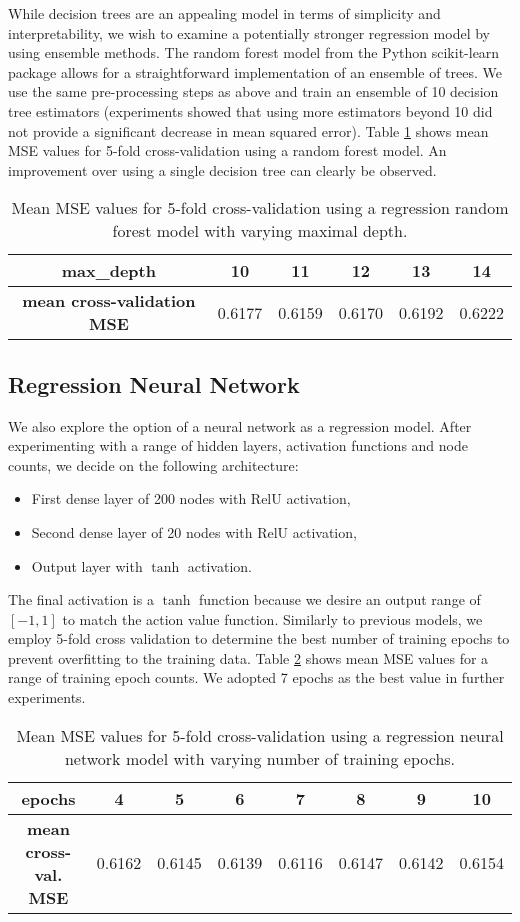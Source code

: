 \documentclass{sfuthesis}
\begin{document}
	While decision trees are an appealing model in terms of simplicity and interpretability, we wish to examine a potentially stronger regression model by using ensemble methods. The random forest model from the Python scikit-learn package allows for a straightforward implementation of an ensemble of trees. We use the same pre-processing steps as above and train an ensemble of 10 decision tree estimators (experiments showed that using more estimators beyond 10 did not provide a significant decrease in mean squared error). Table \ref{tab:forest-mse} shows mean MSE values for 5-fold cross-validation using a random forest model. An improvement over using a single decision tree can clearly be observed.
	\begin{table}[ht]
		\centering
		\begin{tabular}{c|ccccc}
			\textbf{max\_depth}                & 10      & 11      & 12     & 13     & 14       \\ \hline
			\textbf{mean cross-validation MSE} & 0.6177 & 0.6159 & 0.6170 & 0.6192 & 0.6222
		\end{tabular}
		\caption{Mean MSE values for 5-fold cross-validation using a regression random forest model with varying maximal depth.}
		\label{tab:forest-mse}
	\end{table}
	
	\subsection{Regression Neural Network}
	
	We also explore the option of a neural network as a regression model. After experimenting with a range of hidden layers, activation functions and node counts, we decide on the following architecture:
	\begin{itemize}
		\item First dense layer of 200 nodes with RelU activation,
		\item Second dense layer of 20 nodes with RelU activation,
		\item Output layer with $\tanh$ activation.
	\end{itemize}
	The final activation is a $\tanh$ function because we desire an output range of $[-1,1]$ to match the action value function. Similarly to previous models, we employ 5-fold cross validation to determine the best number of training epochs to prevent overfitting to the training data. Table \ref{tab:nn-mse} shows mean MSE values for a range of training epoch counts. We adopted 7 epochs as the best value in further experiments.
	\begin{table}[ht]
		\centering
		\begin{tabular}{c|ccccccc}
			\textbf{epochs} & 4 & 5 & 6 & 7 & 8 & 9 & 10 \\ \hline
			\textbf{mean cross-val. MSE} & 0.6162 & 0.6145 & 0.6139 & 0.6116 & 0.6147 & 0.6142 & 0.6154
		\end{tabular}
		\caption{Mean MSE values for 5-fold cross-validation using a regression neural network model with varying number of training epochs.}
		\label{tab:nn-mse}
	\end{table}
	
\end{document}

